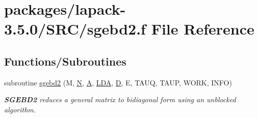 \hypertarget{sgebd2_8f}{}\section{packages/lapack-\/3.5.0/\+S\+R\+C/sgebd2.f File Reference}
\label{sgebd2_8f}
\subsection*{Functions/\+Subroutines}
\begin{DoxyCompactItemize}
\item 
subroutine \hyperlink{group__realGEcomputational_ga852b6c5f1ed8ffe46a79b504e7e03e3f}{sgebd2} (M, \hyperlink{polmisc_8c_a0240ac851181b84ac374872dc5434ee4}{N}, \hyperlink{classA}{A}, \hyperlink{example__user_8c_ae946da542ce0db94dced19b2ecefd1aa}{L\+D\+A}, \hyperlink{odrpack_8h_a7dae6ea403d00f3687f24a874e67d139}{D}, E, T\+A\+U\+Q, T\+A\+U\+P, W\+O\+R\+K, I\+N\+F\+O)
\begin{DoxyCompactList}\small\item\em {\bfseries S\+G\+E\+B\+D2} reduces a general matrix to bidiagonal form using an unblocked algorithm. \end{DoxyCompactList}\end{DoxyCompactItemize}
